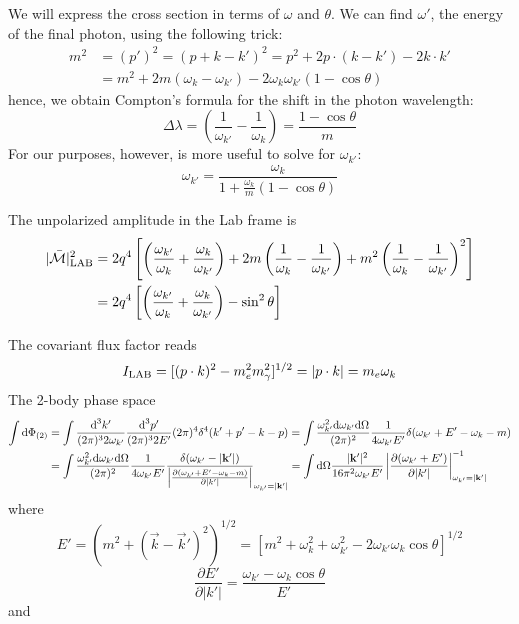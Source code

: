 \documentclass[TheoreticalPhy_ModB.tex]{subfiles}
\begin{document}
We will express the cross section in terms of $\omega$ and $\theta$. We can find $\omega'$, the energy of the final photon, using the following trick:
\begin{align*}
m^2&=(p')^2=(p+k-k')^2=p^2+2p\cdot(k-k')-2k\cdot k'\\
&=m^2+2m(\omega_k-\omega_{k'})-2\omega_k\omega_{k'}(1-\cos\theta)
\end{align*}
hence, we obtain Compton's formula for the shift in the photon wavelength:
\[\Delta\lambda=\left(\frac1{\omega_{k'}}-\frac1{\omega_{k}}\right)=\frac{1-\cos\theta}{m}\]
For our purposes, however, is more useful to solve for $\omega_{k'}$:
\begin{equation}\label{eqn:QED-compton-energies-lab}
\omega_{k'}=\frac{\omega_k}{1+\frac{\omega_{k}}m(1-\cos\theta)}
\end{equation}

The unpolarized amplitude in the Lab frame is
\begin{align*}
|\bar{\mathcal M}|_{\textup{LAB}}^2&=2q^4\left[\left(\frac{\omega_{k'}}{\omega_k}+\frac{\omega_k}{\omega_{k'}}\right)+2m\left(\frac1{\omega_k}-\frac1{\omega_{k'}}\right)+m^2\left(\frac1{\omega_k}-\frac1{\omega_{k'}}\right)^2\right]\\
&=2q^4\left[\left(\frac{\omega_{k'}}{\omega_k}+\frac{\omega_k}{\omega_{k'}}\right)-\sin^2\theta\right]
\end{align*}

The covariant flux factor reads
\[I_{\textup{LAB}}=[(p\cdot k)^2-m_e^2m_\gamma^2]^{1/2}=|p\cdot k|=m_e\omega_k\]
The 2-body phase space
\begin{align*}
\int\textup{d}\Phi_{(2)}&=\int \frac{\textup{d}^3k'}{(2\pi)^32\omega_{k'}}\frac{\textup{d}^3p'}{(2\pi)^32E'}(2\pi)^4\delta^4(k'+p'-k-p)
=\int\frac{\omega^2_{k'}\textup{d}\omega_{k'}\textup{d}\Omega}{(2\pi)^2}\frac{1}{4\omega_{k'}E'}\delta(\omega_{k'}+E'-\omega_k-m)\\
&=\int\frac{\omega^2_{k'}\textup{d}\omega_{k'}\textup{d}\Omega}{(2\pi)^2}\frac{1}{4\omega_{k'}E'}\frac{\delta(\omega_{k'}-|\mathbf k'|)}{\left|\frac{\partial(\omega_{k'}+E'-\omega_k-m)}{\partial|k'|}\right|}_{\omega_{k'}=|\mathbf k'|}
=\int\textup{d}\Omega\frac{|\mathbf k'|^2}{16\pi^2\omega_{k'}E'}\left|\frac{\partial(\omega_{k'}+E')}{\partial|k'|}\right|^{-1}_{\omega_{k'}=|\mathbf k'|}
\end{align*}
where 
\[E'=\left(m^2+(\vec k-\vec k')^2\right)^{1/2}
=\left[m^2+\omega_k^2+\omega_{k'}^2-2\omega_{k'}\omega_k\cos\theta\right]^{1/2}\]
\[\frac{\partial E'}{\partial|k'|}=\frac{\omega_{k'}-\omega_k\cos\theta}{E'}\]
and
\end{document}
